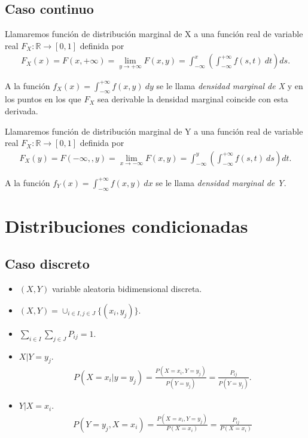 \subsection{Caso continuo}
\begin{defi}
Llamaremos función de distribución marginal de X a una función real de variable real $F_X : \mathbb{R} \longrightarrow [0,1]$ definida por
\begin{align*}
    F_X(x) = F(x,+\infty) = \lim_{y \to +\infty}{F(x,y)} = \int_{-\infty}^{x}{\left(\int_{-\infty}^{+\infty}{f(s,t) \ dt }\right) ds}.
\end{align*}
\end{defi}
A la función $f_X(x) = \int_{-\infty}^{+\infty}{f(x,y) \ dy}$ se le llama \textit{densidad marginal de X} y en los puntos en los que $F_X$ sea derivable la densidad marginal coincide con esta derivada.

\begin{defi}
Llamaremos función de distribución marginal de Y a una función real de variable real $F_X : \mathbb{R} \longrightarrow [0,1]$ definida por
\begin{align*}
    F_X(y) = F(-\infty,,y) = \lim_{x \to -\infty}{F(x,y)} = \int_{-\infty}^{y}{\left(\int_{-\infty}^{+\infty}{f(s,t) \ ds }\right) dt}.
\end{align*}
\end{defi}
A la función $f_Y(x) = \int_{-\infty}^{+\infty}{f(x,y) \ dx}$ se le llama \textit{densidad marginal de Y}.

\section{Distribuciones condicionadas}

\subsection{Caso discreto}
\begin{itemize}
    \item $(X,Y)$ variable aleatoria bidimensional discreta.
    \item $(X,Y) = \cup_{i \in I, j \in J}{\{(x_i,y_j)\}}$.
    \item $\sum_{i \in I}{\sum_{j \in J}{P_{ij}}} = 1$.
    \item $X | Y = y_j$.
    \begin{align*}
    P(X = x_i | y = y_j) = \frac{P(X = x_i, Y = y_j)}{P(Y = y_j)} = \frac{P_{ij}}{P(Y = y_j)}.
    \end{align*}
    \item $Y | X = x_i$.
    \begin{align*}
        P(Y = y_j, X = x_i) = \frac{P(X = x_i, Y = y_j)}{P(X = x_i)} = \frac{P_{ij}}{P(X = x_i)}
    \end{align*}
\end{itemize}
